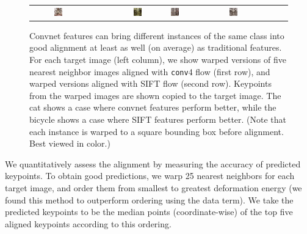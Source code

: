 \documentclass{article} %
\newcommand{\trevor}[1]{}
\begin{document}
\begin{figure}[t]
{\begin{tabular}{crccccc}
\includegraphics[width=0.16\textwidth]{figures/align_bicycle190_warp2_sift} &
\includegraphics[width=0.16\textwidth]{figures/align_bicycle190_warp3_sift} &
\includegraphics[width=0.16\textwidth]{figures/align_bicycle190_warp4_sift} &
\includegraphics[width=0.16\textwidth]{figures/align_bicycle190_warp5_sift}
\end{tabular}
}
\caption{
Convnet features can bring different instances of the same class into good
alignment at least as well (on average) as traditional features.
For each target image (left column), we show warped versions of five nearest
neighbor images aligned with \texttt{conv}4 flow (first row), and warped
versions aligned with SIFT flow \cite{sift-flow} (second row).
Keypoints from the warped images are shown copied to the target image.
The cat shows a case where convnet features perform better, while the bicycle shows
a case where SIFT features perform better.
(Note that each instance is warped to a square bounding box before alignment.
Best viewed in color.)
\trevor{Mention flipping? or flip in figure? Otherwise the second on looks like an error.}}
\label{fig:align}
\end{figure}

We quantitatively assess the alignment by measuring the accuracy of predicted
keypoints. To obtain good predictions, we warp 25 nearest neighbors for each
target image, and order them from smallest to greatest deformation energy
(we
found this method to outperform ordering using the data term).
We take the predicted keypoints to be the median points (coordinate-wise) of the
top five aligned keypoints according to this ordering.
\end{document}
